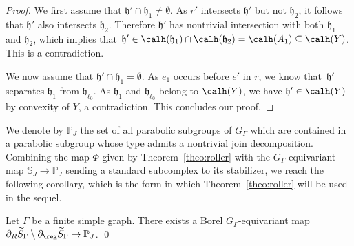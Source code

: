\begin{proof}
We first assume that $\mathfrak h'\cap \mathfrak h_1\neq\emptyset$. As $r'$ intersects $\mathfrak h'$ but not $\mathfrak{h}_2$, it follows that $\mathfrak{h}'$ also intersects $\mathfrak{h}_2$. Therefore $\mathfrak{h}'$ has nontrivial intersection with both $\mathfrak h_1$ and $\mathfrak h_2$, which implies that $\mathfrak h'\in\calh(\mathfrak h_1)\cap \calh(\mathfrak h_2)=\calh(A_1)\subseteq\calh(Y)$. This is a contradiction.

We now assume that $\mathfrak h'\cap \mathfrak h_1=\emptyset$. As $e_1$ occurs before $e'$ in $r$, we know that~$\mathfrak h'$ separates $\mathfrak h_1$ from $\mathfrak h_{\ell_0}$. As $\mathfrak h_1$ and $\mathfrak h_{\ell_0}$ belong to $\calh(Y)$, we have $\mathfrak h'\in \calh(Y)$ by convexity of $Y$, a contradiction. This concludes our proof.
\end{proof}

We denote by $\mathbb P_J$ the set of all parabolic subgroups of $G_\Gamma$ which are contained in a parabolic subgroup whose type admits a nontrivial join decomposition. Combining the map $\Phi$ given by Theorem~\ref{theo:roller} with the $G_\Gamma$-equivariant map $\mathbb{S}_J\to\mathbb{P}_J$ sending a standard subcomplex to its stabilizer, we reach the following corollary, which is the form in which Theorem~\ref{theo:roller} will be used in the sequel.

\begin{cor}\label{cor:roller}
Let $\Gamma$ be a finite simple graph. There exists a Borel $G_\Gamma$-equivariant map $\partial_R\widetilde{S}_\Gamma\setminus\partial_\reg\widetilde{S}_\Gamma\to\mathbb{P}_J$.
\qed
\end{cor}

